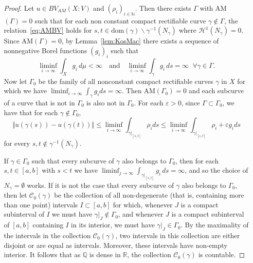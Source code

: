 \documentclass[11pt, letterpaper]{amsart} %
\newcommand*{\R}{{\mathbb R}}
\newcommand*{\N}{{\mathbb N}}
\newcommand*{\Q}{\mathbb{Q}}
\numberwithin{equation}{section}
\theoremstyle{plain}
\theoremstyle{definition}
\begin{document}
{\begin{proof}
Let $u\in BV_{AM}(X:V)$ and $(\rho_i )_{i\in\N}$. Then there exists $\Gamma$ with AM$(\Gamma)=0$ such that for 
each non constant compact rectifiable curve $\gamma\notin\Gamma$, the relation~\eqref{eq:AMBV} holds for 
$s,t\in \mathrm{dom}(\gamma )\backslash \gamma^{-1}(N_\gamma )$ where $\mathcal{H}^1(N_\gamma )=0$. Since 
AM$(\Gamma)=0$, by Lemma~\ref{lem:KosMac} there exists a sequence of nonnegative Borel functions $(g_i)_i$ such that
\[
\liminf_{i\to\infty}\int_Xg_i\,d\mu <\infty\quad\text{and}\quad \liminf_{i\to\infty}\int_\gamma g_i\,ds =\infty\;\;\forall\gamma\in\Gamma.
\]
Now let $\Gamma_0$ be the family of all nonconstant compact rectifiable curves $\gamma$ in $X$ for which we have
$\liminf_{i\to\infty}\int_\gamma g_ids =\infty$. Then AM$(\Gamma_0)=0$ and each subcurve of a curve that is not
in $\Gamma_0$ is 
also not in $\Gamma_0$. For each $\varepsilon>0$, since $\Gamma\subset\Gamma_0$, we have that for each 
$\gamma\notin\Gamma_0$,
\begin{equation}\label{eq:bound2}
\Vert u(\gamma (s))-u(\gamma (t))\Vert
\leq\liminf_{i\to\infty}\int_{\gamma |_{[s,t]}}\rho_i ds \leq\liminf_{i\to\infty}\int_{\gamma |_{[s,t]}}\rho_i+\varepsilon g_i ds
\end{equation}
for every $s,t\notin\gamma^{-1}(N_\gamma)$. 

If $\gamma\in\Gamma_0$ such that every subcurve of $\gamma$ also belongs to $\Gamma_0$, then for each
$s,t\in [a,b]$ with $s<t$ we have $\liminf_{j\to\infty}\int_{\gamma\vert_{[s,t]}}g_i\, ds=\infty$, and so the choice of
$N_\gamma=\emptyset$ works. If it is not the case that every subcurve of $\gamma$ also belongs to $\Gamma_0$, 
then let $\mathcal{C}_0(\gamma)$ be the collection of all non-degenerate (that is, containing more than one point)
intervals $I\subset[a,b]$ for which, whenever $J$ is a compact subinterval of $I$ we must have 
$\gamma\vert_J\not\in\Gamma_0$, and whenever $J$ is a compact subinterval of $[a,b]$ containing $I$ in its interior,
we must have $\gamma\vert_J\in\Gamma_0$. 
By the maximality of the intervals in the collection $\mathcal{C}_0(\gamma)$, two intervals in this collection are either disjoint
or are equal as intervals. Moreover, these intervals have non-empty interior. It follows that as $\Q$ is dense in $\R$,
the collection $\mathcal{C}_0(\gamma)$ is countable.


\end{proof}}
\end{document}

